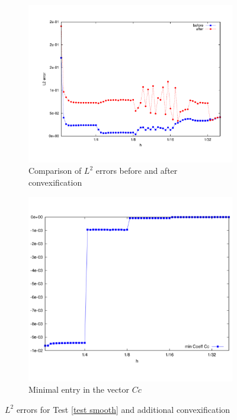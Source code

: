 \begin{figure}[H]
\centering
	\begin{subfigure}{0.45\textwidth}
		\centering
		\includegraphics[scale=0.25]{plots/MA1_convexComp.pdf}
		\caption{Comparison of $L^2$ errors before and after convexification
		}
		\label{fig: convex before after}
	\end{subfigure}
	\begin{subfigure}{0.45\textwidth}
		\centering
		\includegraphics[scale=0.25]{plots/MA1_minCoeff.pdf}
		\caption{Minimal entry in the vector $C c$ \phantom{Comparison of $L^2$ errors before and after convexification}}
		\label{fig: convex min coeffs}
	\end{subfigure}	
	\caption{$L^2$ errors for Test \ref{test smooth} and additional convexification}
	\label{fig: Compare test smooth ourMethodConvex}
\end{figure}


